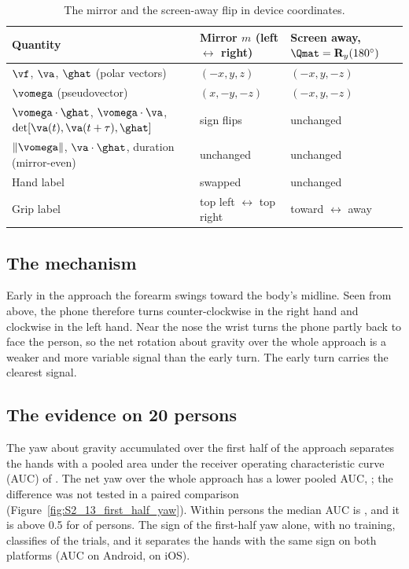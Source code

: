 \begin{table}[htbp]
\centering
\caption{The mirror and the screen-away flip in device coordinates.}\label{tab:mirror}
\footnotesize
\begin{tabular}{@{}lll@{}}
\toprule
Quantity & Mirror $m$ (left $\leftrightarrow$ right) & Screen away, $\Qmat = \mathbf{R}_y(180^\circ)$ \\
\midrule
$\vf$, $\va$, $\ghat$ (polar vectors) & $(-x, y, z)$ & $(-x, y, -z)$ \\
$\vomega$ (pseudovector) & $(x, -y, -z)$ & $(-x, y, -z)$ \\
$\vomega\cdot\ghat$, $\vomega\cdot\va$, $\det[\va(t), \va(t+\tau), \ghat]$ & sign flips & unchanged \\
$\lVert\vomega\rVert$, $\va\cdot\ghat$, duration (mirror-even) & unchanged & unchanged \\
Hand label & swapped & unchanged \\
Grip label & top left $\leftrightarrow$ top right & toward $\leftrightarrow$ away \\
\bottomrule
\end{tabular}
\end{table}

\subsection{The mechanism}\label{sec:physics:mechanism}
Early in the approach the forearm swings toward the body's midline. Seen from above, the phone therefore turns
counter-clockwise in the right hand and clockwise in the left hand. Near the nose the wrist turns the phone partly
back to face the person, so the net rotation about gravity over the whole approach is a weaker and more variable
signal than the early turn. The early turn carries the clearest signal.

\subsection{The evidence on 20 persons}\label{sec:physics:evidence}
The yaw about gravity accumulated over the first half of the approach separates the hands with a pooled area under
the receiver operating characteristic curve (AUC) of . The net yaw over the whole
approach has a lower pooled AUC, ; the difference was not tested in a paired
comparison (Figure~\ref{fig:S2_13_first_half_yaw}). Within persons the median AUC is
, and it is above 0.5 for  of
 persons. The sign of the first-half yaw alone, with no training, classifies
 of the trials, and it separates the hands with the same sign on both platforms
(AUC  on Android,  on iOS).

